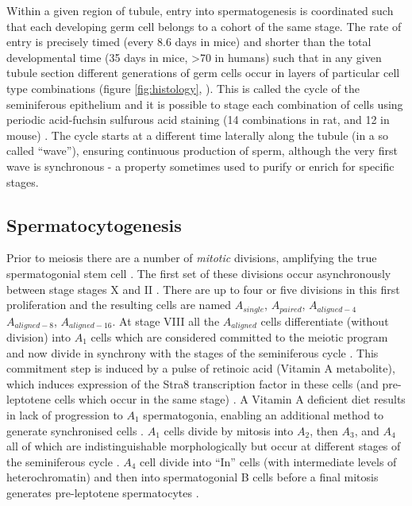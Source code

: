 Within a given region of tubule, entry into spermatogenesis is coordinated such that each developing germ cell belongs to a cohort of the same stage.
The rate of entry is precisely timed (every 8.6 days in mice) and shorter than the total developmental time (35 days in mice, >70 in humans) such that in any given tubule section different generations of germ cells occur in layers of particular cell type combinations (figure \ref{fig:histology}, \cite{Oakberg1956Duration,Clermont1969Duration, Heller1969Human}).
This is called the cycle of the seminiferous epithelium and it is possible to stage each combination of cells using periodic acid‐fuchsin sulfurous acid staining (14 combinations in rat, and 12 in mouse) \parencite{Leblond1952Spermiogenesis, Leblond1952Definition, Oakberg1956description}.
The cycle starts at a different time laterally along the tubule (in a so called ``wave''), ensuring continuous production of sperm, although the very first wave is synchronous - a property sometimes used to purify or enrich for specific stages.

\subsection{Spermatocytogenesis}
Prior to meiosis there are a number of \emph{mitotic} divisions, amplifying the true spermatogonial stem cell \parencite{Oakberg1971Spermatogonial, Huckins1971spermatogonial}.
The first set of these divisions occur asynchronously between stage stages X and II \parencite{Rooij2001Proliferation}.
There are up to four or five divisions in this first proliferation and the resulting cells are named $A_{single}$, $A_{paired}$, $A_{aligned-4}$ $A_{aligned-8}$, $A_{aligned-16}$.
At stage VIII all the $A_{aligned}$ cells differentiate (without division) into $A_1$ cells which are considered committed to the meiotic program and now divide in synchrony with the stages of the seminiferous cycle \parencite{Rooij2000All}.
This commitment step is induced by a pulse of retinoic acid (Vitamin A metabolite), which induces expression of the Stra8 transcription factor in these cells (and pre-leptotene cells which occur in the same stage) \parencite{Griswold2012Initiating, Lin2008Germ, Zhou2008Expression, Hogarth2015Processive, Griswold2015Spermatogenesis}.
A Vitamin A deficient diet results in lack of progression to $A_1$ spermatogonia, enabling an additional method to generate synchronised cells \parencite{Thompson1964Vitamin}.
$A_1$ cells divide by mitosis into $A_2$, then $A_3$, and $A_4$ all of which are indistinguishable morphologically but occur at different stages of the seminiferous cycle \parencite{Rooij2000All}.
$A_4$ cell divide into ``In'' cells (with intermediate levels of heterochromatin) and then into spermatogonial B cells before a final mitosis generates pre-leptotene spermatocytes \parencite{Rooij2000All}.

